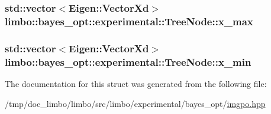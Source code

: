 \subsubsection[{x\+\_\+max}]{\setlength{\rightskip}{0pt plus 5cm}std\+::vector$<$Eigen\+::\+Vector\+Xd$>$ limbo\+::bayes\+\_\+opt\+::experimental\+::\+Tree\+Node\+::x\+\_\+max}\label{structlimbo_1_1bayes__opt_1_1experimental_1_1_tree_node_a3948f2f233995ce1cd4b36d3944b27b9}
\hypertarget{structlimbo_1_1bayes__opt_1_1experimental_1_1_tree_node_a09ee8e7b77c04a859ecdc253329303f4}{}
\subsubsection[{x\+\_\+min}]{\setlength{\rightskip}{0pt plus 5cm}std\+::vector$<$Eigen\+::\+Vector\+Xd$>$ limbo\+::bayes\+\_\+opt\+::experimental\+::\+Tree\+Node\+::x\+\_\+min}\label{structlimbo_1_1bayes__opt_1_1experimental_1_1_tree_node_a09ee8e7b77c04a859ecdc253329303f4}


The documentation for this struct was generated from the following file\+:\begin{DoxyCompactItemize}
\item 
/tmp/doc\+\_\+limbo/limbo/src/limbo/experimental/bayes\+\_\+opt/\hyperlink{imgpo_8hpp}{imgpo.\+hpp}\end{DoxyCompactItemize}
